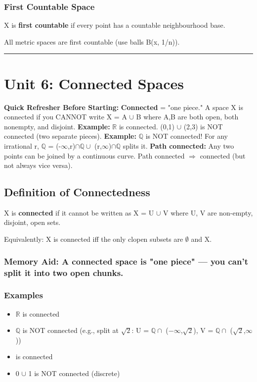 \documentclass[12pt,a4paper,openany]{book}
\begin{document}
{{\subsubsection{First Countable Space}
X is \textbf{first countable} if every point has a countable neighbourhood base.

All metric spaces are first countable (use balls B(x, 1/n)).

\bigskip\noindent\rule{\textwidth}{0.4pt}\bigskip

\section{Unit 6: Connected Spaces }

\begin{prereqbox}
 \textbf{Quick Refresher Before Starting:}
\textbf{Connected} = "one piece." A space X is connected if you CANNOT write X = A $\cup$ B where A,B are both open, both nonempty, and disjoint.
\textbf{Example:} $\mathbb{R}$ is connected. (0,1) $\cup$ (2,3) is NOT connected (two separate pieces).
\textbf{Example:} $\mathbb{Q}$ is NOT connected! For any irrational r, $\mathbb{Q}$ = (-$\infty$,r)$\cap\mathbb{Q}\cup$ (r,$\infty$)$\cap\mathbb{Q}$ splits it.
\textbf{Path connected:} Any two points can be joined by a continuous curve. Path connected $\Longrightarrow$ connected (but not always vice versa).
\end{prereqbox}


\subsection{Definition of Connectedness}

X is \textbf{connected} if it cannot be written as X = U $\cup$ V where U, V are non-empty, disjoint, open sets.

Equivalently: X is connected iff the only clopen subsets are $\emptyset$ and X.

\subsubsection{ Memory Aid: A connected space is "one piece" — you can't split it into two open chunks.}

\subsubsection{Examples}
\begin{itemize}[leftmargin=*]
  \item $\mathbb{R}$ is connected 
  \item $\mathbb{Q}$ is NOT connected (e.g., split at $\sqrt{2}$: U = $\mathbb{Q}\cap$ (−$\infty$,$\sqrt{2}$), V = $\mathbb{Q}\cap$ ($\sqrt{2}$,$\infty$))
  \item [0,1] is connected 
  \item {0} $\cup$ {1} is NOT connected (discrete)
\end{itemize}

}}
\end{document}
